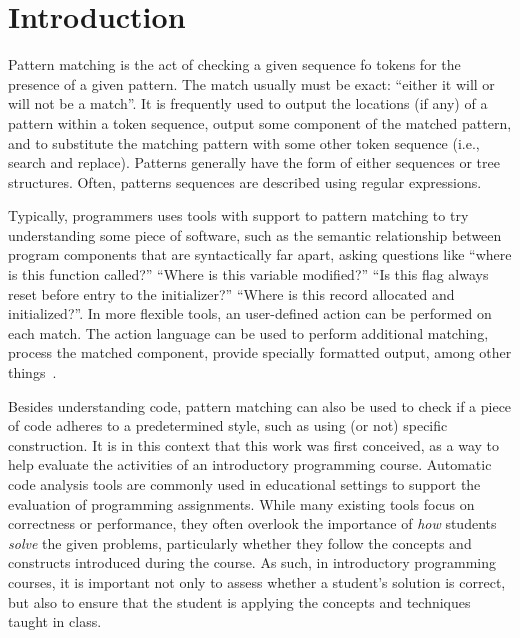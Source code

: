 \chapter{Introduction}\label{chap:intro}

Pattern matching is the act of checking a given sequence fo tokens for the presence
of a given pattern. The match usually must be exact: ``either it will or will 
not be a match''. It is frequently used to output the locations (if any) of a 
pattern within a token sequence, output some component of the matched pattern,
and to substitute the matching pattern with some other token sequence (i.e., 
search and replace). Patterns generally have the form of either sequences or 
tree structures. Often, patterns sequences are described using regular expressions.

Typically, programmers uses tools with support to pattern matching to try 
understanding some piece of software, such as the semantic relationship between 
program components that are syntactically far apart, asking questions like
``where is this function called?'' ``Where is this variable modified?'' ``Is this
flag always reset before entry to the initializer?'' ``Where is this record 
allocated and initialized?''. In more flexible tools, an user-defined action can 
be performed on each match. The action language can be used to perform additional 
matching, process the matched component, provide specially formatted output, among 
other things~\cite{atkinson2006-effective-pattern-matching}.

Besides understanding code, pattern matching can also be used to check if a piece
of code adheres to a predetermined style, such as using (or not) specific construction.
It is in this context that this work was first conceived, as a way to help evaluate 
the activities of an introductory programming course.
Automatic code analysis tools are commonly used in educational settings to
support the evaluation of programming assignments. While many existing tools
focus on correctness or performance, they often overlook the importance of
\emph{how} students \emph{solve} the given problems, particularly whether 
they follow the concepts and constructs introduced during the course. 
As such, in introductory programming courses, it is important not only to 
assess whether a student's solution is correct, but also to ensure that the 
student is applying the concepts and techniques taught in class. 

